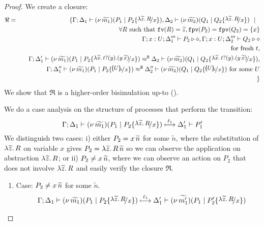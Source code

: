 \begin{proof}
	We create a closure:
%
	\begin{eqnarray*}
		\Re &=&
			\set{\horel{\Gamma}{\Delta_1}{\newsp{\widetilde{m_1}}{P_1 \Par P_2 \subst{\abs{\widetilde{z}}{R}}{x}}}{,}
			{\Delta_2}{\newsp{\widetilde{m_2}}{Q_1 \Par Q_2 \subst{\abs{\widetilde{z}}{R}}{x}}} \setbar \\
			&& \quad \forall R \textrm{ such that } \fv{R} = \widetilde{z}, \fpv{P_2} = \fpv{Q_2} = \set{x}\\
			&& \quad \Gamma; x: U; \Delta_1''' \proves P_2 \hastype \Proc, \Gamma; x: U; \Delta_2''' \proves Q_2 \hastype \Proc\\
			&& \quad \textrm{for fresh } t,\\
			&& \quad \horel{\Gamma}{\Delta_1'}{\newsp{\widetilde{m_1}}{P_1 \Par P_2 \subst{\auxtr{t}}{x}}}{\hwb}{\Delta_2}{\newsp{\widetilde{m_2}}{Q_1 \Par Q_2 \subst{\auxtr{t}}{x}}},\\
			&& \quad \horel{\Gamma}{\Delta_1''}{\newsp{\widetilde{m_1}}{P_1 \Par P_2 \subst{\omapchar{U}}{x}}}{\hwb}{\Delta_2''}{\newsp{\widetilde{m_2}}{Q_1 \Par Q_2 \subst{\omapchar{U}}{x}} \textrm{ for some } U}\\
			&&}
	\end{eqnarray*}
%
	\noi  We show that $\Re$ is a higher-order bisimulation up-to \betatran ().

	\noi We do a case analysis on the structure of processes that perform the transition:
%
	\[
		\horel{\Gamma}{\Delta_1}{\newsp{\widetilde{m_1}}{P_1 \Par P_2\subst{\abs{\widetilde{z}}{R}}{x} }}{\hby{\ell_1}}{\Delta_1'}{P_1'}
	\]
%
	\noi We distinguish two cases:
	i) either $P_2 = x\, {\widetilde{n}}$ for some $\widetilde{n}$,
	where the substitution of $\lambda \widetilde{z}.\,R$
	on variable $x$ gives
	$P_2 = \lambda \widetilde{z}.\,R\, {\widetilde{n}}$ so we can observe the
	application on abstraction $\lambda \widetilde{z}.\,R$; or
	ii) $P_2 \not= x\, {\widetilde{n}}$, where we can observe
	an action on $P_2$ that does not involve $\lambda \widetilde{z}.\,R$
	and easily verify the closure $\Re$.

\begin{enumerate}
	\item Case: $P_2 \not= x\, {\widetilde{n}}$ for some $\widetilde{n}$.
%
	\begin{eqnarray*}
		&&	\horel{\Gamma}{\Delta_1}
		{\newsp{\widetilde{m_1}}{P_1 \Par P_2 \subst{\abs{\widetilde{z}}{R}}{x} }}
			{\hby{\ell_1}}
		{\Delta_1'}{\newsp{\widetilde{m_1'}}{P_1 \Par P_2' \subst{\abs{\widetilde{z}}{R}}{x}}}
	\end{eqnarray*}


\end{enumerate}
\end{proof}
